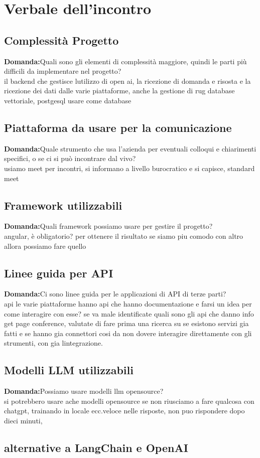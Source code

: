 \documentclass{article}
\begin{document}
\section{Verbale dell'incontro}
\subsection{Complessità Progetto}
\textbf{Domanda:}Quali sono gli elementi di complessità maggiore, quindi le parti più difficili da implementare nel progetto?\\
il backend che gestisce lutilizzo di open ai, la ricezione di domanda e risosta e la ricezione dei dati dalle
varie piattaforme, anche la gestione di rug database vettoriale, postgesql usare come database
\subsection{Piattaforma da usare per la comunicazione}
\textbf{Domanda:}Quale strumento che usa l’azienda per eventuali colloqui e chiarimenti specifici, o se ci si può incontrare dal vivo?\\
usiamo meet per incontri, si informano a livello burocratico e si capisce, standard meet
\subsection{Framework utilizzabili}
\textbf{Domanda:}Quali framework possiamo usare per gestire il progetto?\\
angular, è obligatorio? per ottenere il risultato se siamo piu comodo con altro allora possiamo fare quello
\subsection{Linee guida per API}
\textbf{Domanda:}Ci sono linee guida per le applicazioni di API di terze parti?\\
api le varie piattaforme hanno api che hanno documentazione e farsi un idea per come interagire con esse?
se va male identificate quali sono gli api che danno info  get page conference, valutate di fare prima una
ricerca su se esistono servizi gia fatti e se hanno gia connettori cosi da non dovere interagire direttamente con 
gli strumenti, con gia lintegrazione.
\subsection{Modelli LLM utilizzabili}
\textbf{Domanda:}Possiamo usare modelli llm opensource?\\
si potrebbero usare ache modelli opensource se non riusciamo a fare qualcosa con chatgpt, 
trainando in locale ecc.veloce nelle risposte, non puo rispondere dopo dieci minuti, 
\subsection{alternative a LangChain e OpenAI}
\end{document}
